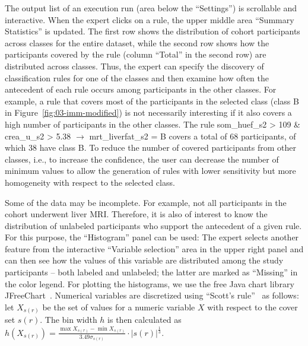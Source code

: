 \documentclass[
  oneside]{book}
\begin{document}
The output list of an execution run (area below the ``Settings'') is scrollable and interactive.
When the expert clicks on a rule, the upper middle area ``Summary Statistics'' is updated.
The first row shows the distribution of cohort participants across classes for the entire dataset, while the second row shows how the participants covered by the rule (column ``Total'' in the second row) are distributed across classes.
Thus, the expert can specify the discovery of classification rules for one of the classes and then examine how often the antecedent of each rule occurs among participants in the other classes.
For example, a rule that covers most of the participants in the selected class (class B in Figure~\ref{fig:03-imm-modified}) is not necessarily interesting if it also covers a high number of participants in the other classes.
The rule som\_huef\_s2 \textgreater{} 109 \& crea\_u\_s2 \textgreater{} 5.38 \(\longrightarrow\) mrt\_liverfat\_s2 = B covers a total of 68 participants, of which 38 have class B.
To reduce the number of covered participants from other classes, i.e., to increase the confidence, the user can decrease the number of minimum values to allow the generation of rules with lower sensitivity but more homogeneity with respect to the selected class.

Some of the data may be incomplete.
For example, not all participants in the cohort underwent liver MRI.
Therefore, it is also of interest to know the distribution of unlabeled participants who support the antecedent of a given rule.
For this purpose, the ``Histogram'' panel can be used: The expert selects another feature from the interactive ``Variable selection'' area in the upper right panel and can then see how the values of this variable are distributed among the study participants -- both labeled and unlabeled; the latter are marked as ``Missing'' in the color legend.
For plotting the histograms, we use the free Java chart library JFreeChart~\autocite{GilbertJFree}.
Numerical variables are discretized using ``Scott's rule''~\autocite{scott1979optimal} as follows:
let \(X_{s(r)}\) be the set of values for a numeric variable \(X\) with respect to the cover set \(s(r)\).
The bin width \(h\) is then calculated as \(h(X_{s(r)})=\frac{\max{X_{s(r)}}-\min{X_{s(r)}}}{3.49\sigma_{s(r)}}\cdot |s(r)|^{\frac{1}{3}}\).
\end{document}
